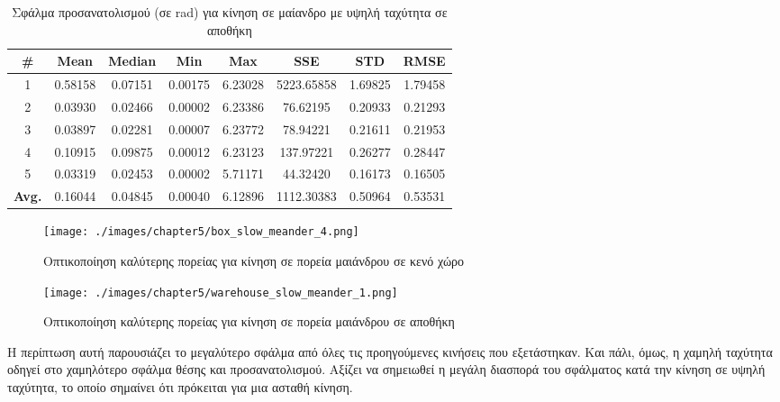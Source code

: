 \begin{table}[H]
    \centering
    \caption{Σφάλμα προσανατολισμού (σε rad) για κίνηση σε μαίανδρο με υψηλή ταχύτητα σε αποθήκη}
    \label{tab:orientation_error_meander_fast_warehouse}
    \begin{tabular}{| c | c | c | c | c | c | c | c | }
        \hline
        \rowcolor{Gray}
        \# & Mean & Median & Min & Max & SSE & STD & RMSE \\
        \hline
        1 & 0.58158 & 0.07151 & 0.00175 & 6.23028 & 5223.65858 & 1.69825 & 1.79458 \\
        2 & 0.03930 & 0.02466 & 0.00002 & 6.23386 & 76.62195 & 0.20933 & 0.21293 \\
        3 & 0.03897 & 0.02281 & 0.00007 & 6.23772 & 78.94221 & 0.21611 & 0.21953 \\
        4 & 0.10915 & 0.09875 & 0.00012 & 6.23123 & 137.97221 & 0.26277 & 0.28447 \\
        5 & 0.03319 & 0.02453 & 0.00002 & 5.71171 & 44.32420 & 0.16173 & 0.16505 \\
        \hline
        \textbf{Avg.} & 0.16044 & 0.04845 & 0.00040 & 6.12896 & 1112.30383 & 0.50964 & 0.53531 \\
        \hline
    \end{tabular}
\end{table}

\begin{figure}[!ht]
    \centering
    \texttt{[image: ./images/chapter5/box\_slow\_meander\_4.png]}
    \caption{Οπτικοποίηση καλύτερης πορείας για κίνηση σε πορεία μαιάνδρου σε κενό χώρο}
    \label{fig:path_meander_slow_corridor}
\end{figure}

\begin{figure}[!ht]
    \centering
    \texttt{[image: ./images/chapter5/warehouse\_slow\_meander\_1.png]}
    \caption{Οπτικοποίηση καλύτερης πορείας για κίνηση σε πορεία μαιάνδρου σε αποθήκη}
    \label{fig:path_meander_slow_warehouse}
\end{figure}

Η περίπτωση αυτή παρουσιάζει το μεγαλύτερο σφάλμα από όλες τις προηγούμενες κινήσεις που εξετάστηκαν. Και πάλι, όμως, η χαμηλή ταχύτητα οδηγεί στο χαμηλότερο σφάλμα θέσης και προσανατολισμού. Αξίζει να σημειωθεί η μεγάλη διασπορά του σφάλματος κατά την κίνηση σε υψηλή ταχύτητα, το οποίο σημαίνει ότι πρόκειται για μια ασταθή κίνηση. 